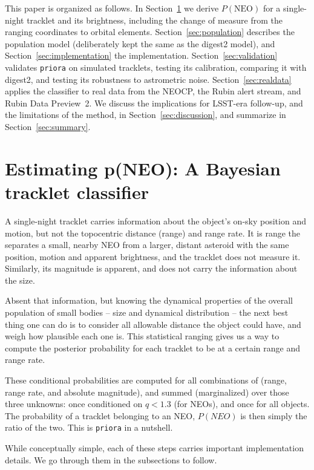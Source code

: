 \documentclass[linenumbers,twocolumn]{aastex701}
\newcommand{\priora}{{\tt priora}\xspace} %
\begin{document}
This paper is organized as follows. In Section~\ref{sec:methods} we derive
$P(\mathrm{NEO})$ for a single-night tracklet and its brightness, including
the change of measure from the ranging coordinates to orbital elements.
Section~\ref{sec:population} describes the population model (deliberately kept
the same as the digest2 model), and Section~\ref{sec:implementation} the
implementation. Section~\ref{sec:validation} validates \priora on simulated
tracklets, testing its calibration, comparing it with digest2, and testing
its robustness to astrometric noise. Section~\ref{sec:realdata} applies the
classifier to real data from the NEOCP, the Rubin alert stream, and Rubin Data
Preview~2. We
discuss the implications for LSST-era follow-up, and the limitations of the
method, in Section~\ref{sec:discussion}, and summarize in
Section~\ref{sec:summary}.

\section{Estimating p(NEO): A Bayesian tracklet classifier}
\label{sec:methods}

A single-night tracklet carries information about the object's on-sky position and motion, but not the topocentric distance (range) and range rate. It is range the separates a
small, nearby NEO from a larger, distant asteroid with the same position,
motion and apparent brightness, and the tracklet does not measure it. Similarly,
its magnitude is apparent, and does not carry the information about the size.

Absent that information, but knowing the dynamical properties of 
the overall population of small bodies -- size and dynamical distribution -- the next best thing one can do is to consider all allowable distance the object could have, and weigh
how plausible each one is. This statistical ranging \citep[][e.g.]{virtanen2001,muinonen2006,chesley2005,farnocchia2015,spoto2018} gives
us a way to compute the posterior probability for each tracklet to be
at a certain range and range rate.

These conditional probabilities are computed for all combinations of (range, range rate, and absolute magnitude), and summed (marginalized) over those three unknowns: once conditioned on $q < 1.3$ (for NEOs), and once for all objects. The probability of a tracklet belonging to an NEO, $P(NEO)$ is then simply the ratio of the two. This is \priora in a nutshell.
\medskip

While conceptually simple, each of these steps carries important implementation details. We go through them in the subsections to follow.
\end{document}
